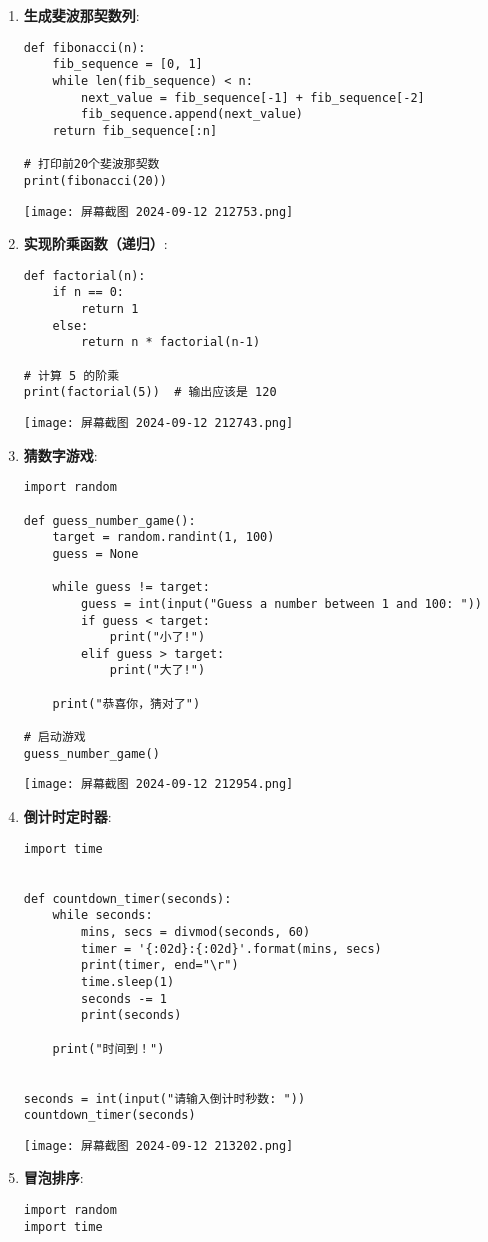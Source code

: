 \documentclass{ctexart}
\begin{document}
\begin{enumerate}[label=\arabic*.]
\item \textbf{生成斐波那契数列}:
\begin{lstlisting}
def fibonacci(n):
    fib_sequence = [0, 1]
    while len(fib_sequence) < n:
        next_value = fib_sequence[-1] + fib_sequence[-2]
        fib_sequence.append(next_value)
    return fib_sequence[:n]

# 打印前20个斐波那契数
print(fibonacci(20))
\end{lstlisting}
\texttt{[image: 屏幕截图 2024-09-12 212753.png]}
\item \textbf{实现阶乘函数（递归）}:
\begin{lstlisting}
def factorial(n):
    if n == 0:
        return 1
    else:
        return n * factorial(n-1)

# 计算 5 的阶乘
print(factorial(5))  # 输出应该是 120
\end{lstlisting}
\texttt{[image: 屏幕截图 2024-09-12 212743.png]}
\item \textbf{猜数字游戏}:
\begin{lstlisting}
import random

def guess_number_game():
    target = random.randint(1, 100)
    guess = None
    
    while guess != target:
        guess = int(input("Guess a number between 1 and 100: "))
        if guess < target:
            print("小了!")
        elif guess > target:
            print("大了!")
    
    print("恭喜你，猜对了")

# 启动游戏
guess_number_game()
\end{lstlisting}
\texttt{[image: 屏幕截图 2024-09-12 212954.png]}
\item \textbf{倒计时定时器}:
\begin{lstlisting}
import time


def countdown_timer(seconds):
    while seconds:
        mins, secs = divmod(seconds, 60)
        timer = '{:02d}:{:02d}'.format(mins, secs)
        print(timer, end="\r")
        time.sleep(1)
        seconds -= 1
        print(seconds)

    print("时间到！")


seconds = int(input("请输入倒计时秒数: "))
countdown_timer(seconds)
\end{lstlisting}
\texttt{[image: 屏幕截图 2024-09-12 213202.png]}
\item \textbf{冒泡排序}:
\begin{lstlisting}
import random
import time



\end{lstlisting}
\end{enumerate}
\end{document}
